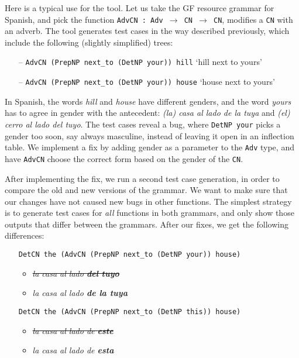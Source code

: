 \documentclass[11pt]{article}
\def\t#1{\texttt{#1}}
\begin{document}
Here is a typical use for the tool. 
Let us take the GF resource grammar \cite{ranta2009rgl} for Spanish, and
pick the function \t{AdvCN : Adv $\rightarrow$ CN $\rightarrow$ CN}, modifies a \t{CN} with
an adverb.
The tool generates test cases in the way described previously,
which include the following (slightly simplified) trees: 
\begin{itemize}
\setlength\itemsep{0em}
\item[--] \t{AdvCN (PrepNP next\_to (DetNP your)) hill} `hill next to
yours'
\item[--] \t{AdvCN (PrepNP next\_to (DetNP your)) house} `house next
to yours'
\end{itemize}
In Spanish, the words \emph{hill} and \emph{house} have different
genders, and the word \emph{yours} has to agree in gender 
with the antecedent: \emph{(la) casa al lado de la tuya} and \emph{(el)
  cerro al lado del tuyo}. The test cases reveal a bug, where \t{DetNP your} 
picks a gender too soon, say always masculine, instead of leaving it
open in an inflection table. We implement a fix by adding gender as a
parameter to the \t{Adv} type, and have \t{AdvCN} choose the correct
form based on the gender of the \t{CN}.

After implementing the fix, we run a second test case generation, in
order to compare the old and new versions of the grammar. We want to
make sure that our changes have not caused new bugs in other
functions. The simplest strategy is to generate test cases for
\emph{all} functions in both grammars, and only show those outputs
that differ between the grammars. After our fixes, we get the
following differences:

\begin{itemize}
\setlength\itemsep{0em}
\item[] \t{DetCN the (AdvCN (PrepNP next\_to (DetNP your)) house)}
  \begin{itemize}
   \item \emph{\sout{la casa al lado {\bf  del tuyo}}}
   \item \emph{la casa al lado {\bf  de la tuya}}
  \end{itemize}
\item[] \t{DetCN the (AdvCN (PrepNP next\_to (DetNP this)) house)}
  \begin{itemize}
   \item \emph{\sout{la casa al lado de {\bf este}}}
   \item \emph{la casa al lado de {\bf esta}}
  \end{itemize}
\end{itemize}
\end{document}
